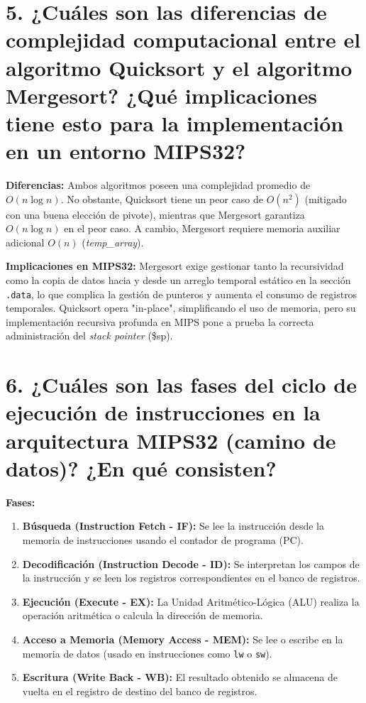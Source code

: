 \documentclass[12pt,a4paper]{article}
\begin{document}
\section*{5. ¿Cuáles son las diferencias de complejidad computacional entre el algoritmo Quicksort y el algoritmo Mergesort? ¿Qué implicaciones tiene esto para la implementación en un entorno MIPS32?}

\textbf{Diferencias:} Ambos algoritmos poseen una complejidad promedio de $O(n \log n)$. No obstante, Quicksort tiene un peor caso de $O(n^2)$ (mitigado con una buena elección de pivote), mientras que Mergesort garantiza $O(n \log n)$ en el peor caso. A cambio, Mergesort requiere memoria auxiliar adicional $O(n)$ (\textit{temp\_array}).

\textbf{Implicaciones en MIPS32:} Mergesort exige gestionar tanto la recursividad como la copia de datos hacia y desde un arreglo temporal estático en la sección \texttt{.data}, lo que complica la gestión de punteros y aumenta el consumo de registros temporales. Quicksort opera "in-place", simplificando el uso de memoria, pero su implementación recursiva profunda en MIPS pone a prueba la correcta administración del \textit{stack pointer} (\$sp).

\section*{6. ¿Cuáles son las fases del ciclo de ejecución de instrucciones en la arquitectura MIPS32 (camino de datos)? ¿En qué consisten?}

\textbf{Fases:}
\begin{enumerate}
    \item \textbf{Búsqueda (Instruction Fetch - IF):} Se lee la instrucción desde la memoria de instrucciones usando el contador de programa (PC).
    \item \textbf{Decodificación (Instruction Decode - ID):} Se interpretan los campos de la instrucción y se leen los registros correspondientes en el banco de registros.
    \item \textbf{Ejecución (Execute - EX):} La Unidad Aritmético-Lógica (ALU) realiza la operación aritmética o calcula la dirección de memoria.
    \item \textbf{Acceso a Memoria (Memory Access - MEM):} Se lee o escribe en la memoria de datos (usado en instrucciones como \texttt{lw} o \texttt{sw}).
    \item \textbf{Escritura (Write Back - WB):} El resultado obtenido se almacena de vuelta en el registro de destino del banco de registros.
\end{enumerate}
\end{document}

